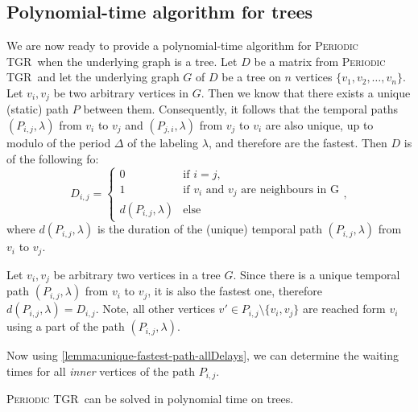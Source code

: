 \documentclass[a4paper,UKenglish,cleveref, autoref, thm-restate, anonymous]{lipics-v2021}
\newcommand{\deltaExact}{\textsc{Periodic TGR}}
\begin{document}
\subsection{Polynomial-time algorithm for trees}\label{sec:treealgo}
We are now ready to provide a polynomial-time algorithm for \deltaExact\ when the underlying graph is a tree.
Let $D$ be a matrix from \deltaExact\ and let the underlying graph $G$ of $D$ be a tree on $n$ vertices $\{v_1, v_2, \dots, v_n\}$.
Let $v_i,v_j$ be two arbitrary vertices in $G$. Then we know that there exists a unique (static) path $P$ between them.
Consequently, it follows that the temporal paths $(P_{i,j},\lambda)$ from $v_i$ to $v_j$ and $(P_{j,i},\lambda)$ from $v_j$ to $v_i$ are also unique, up to modulo of the period $\Delta$ of the labeling $\lambda$,
and therefore are the fastest.
Then $D$ is of the following fo\rm:
\begin{equation*}
    D_{i,j} =
    \begin{cases}
    0 & \text{if $i = j$}, \\
    1 & \text{if $v_i$ and $v_j$ are neighbours in G}\\
    d(P_{i,j},\lambda) & \text{else}
    \end{cases},
\end{equation*}
where $d(P_{i,j},\lambda)$ is the duration of the (unique) temporal path $(P_{i,j},\lambda)$ from $v_i$ to $v_j$.

\begin{observation}\label{obs:travel-delays-in-trees}
    Let $v_i,v_j$  be arbitrary two vertices in a tree $G$. 
    Since there is a unique temporal path $(P_{i,j},\lambda)$ from $v_i$ to $v_j$, it is also the fastest one, therefore $d(P_{i,j},\lambda) = D_{i,j}$. 
    Note, all other vertices $v' \in P_{i,j} \setminus \{v_i,v_j\}$ are reached form $v_i$ using a part of the path $(P_{i,j},\lambda)$.
\end{observation}

Now using \cref{lemma:unique-fastest-path-allDelays}, we can determine the waiting times for all \emph{inner} vertices of the path $P_{i,j}$.

\begin{theorem} \label{thm:deltaExact-PolyTimeTrees}
    \deltaExact\ can be solved in polynomial time on trees.
\end{theorem}
\end{document}
